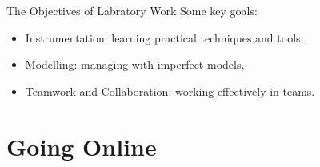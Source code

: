 \documentclass{beamer}
\begin{document}
\begin{frame}{The Objectives of Labratory Work}
  Some key goals:~\cite{Feisel2005}
  \begin{itemize}
    \item{
      Instrumentation: learning practical techniques and tools,
    } \pause
    \item{
      Modelling: managing with imperfect models,
    } \pause
    \item{
      Teamwork and Collaboration: working effectively in teams.
    }
  \end{itemize}
\end{frame}

\section{Going Online}

\end{document}
